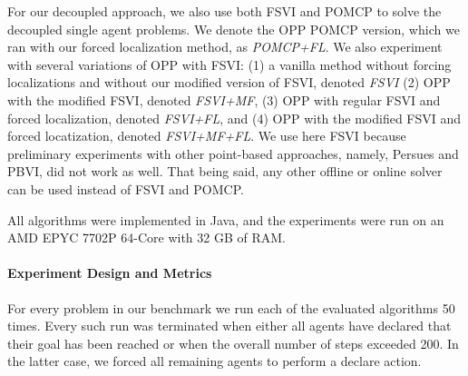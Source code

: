 \documentclass[letterpaper]{article} %
\begin{document}
For our decoupled approach, we also use both FSVI and POMCP to solve the decoupled single agent problems. We denote the OPP POMCP version, which we ran with our forced localization method, as \emph{POMCP+FL}.
We also experiment with several variations of OPP with FSVI: (1) a vanilla method without forcing localizations and without our modified version of FSVI, denoted \emph{FSVI} (2) OPP with the modified FSVI, denoted \emph{FSVI+MF},  (3) OPP with regular FSVI and forced localization, denoted \emph{FSVI+FL}, and (4) OPP with the modified FSVI and forced locatization, denoted \emph{FSVI+MF+FL}. 
We use here FSVI because preliminary experiments with other point-based approaches, namely, Persues and PBVI, did not work as well. That being said, any other offline or online solver can be used instead of FSVI and POMCP.




All algorithms were implemented in Java, and the experiments were run on an AMD\textsc{\textregistered} EPYC 7702P 64-Core with 32 GB of RAM.



\paragraph{Experiment Design and Metrics}

For every problem in our benchmark we run each of the evaluated algorithms 50 times. 
Every such run was terminated when either all agents have declared that their goal has been reached or when the overall number of steps exceeded 200. In the latter case, we forced all remaining agents to perform a declare action. 
\end{document}
